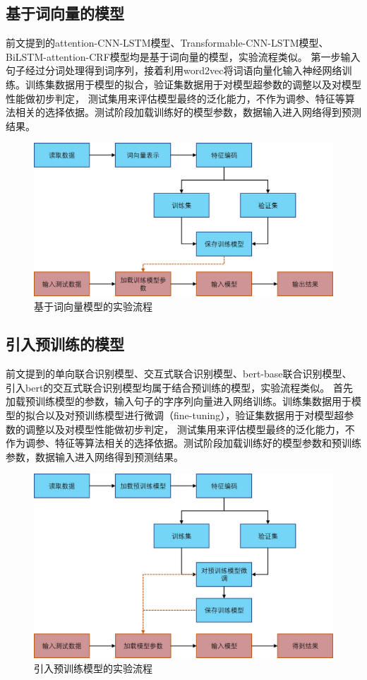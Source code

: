 \subsection{基于词向量的模型}
前文提到的attention-CNN-LSTM模型、Transformable-CNN-LSTM模型、BiLSTM-attention-CRF模型均是基于词向量的模型，实验流程类似。
第一步输入句子经过分词处理得到词序列，接着利用word2vec将词语向量化输入神经网络训练。训练集数据用于模型的拟合，验证集数据用于对模型超参数的调整以及对模型性能做初步判定，
测试集用来评估模型最终的泛化能力，不作为调参、特征等算法相关的选择依据。测试阶段加载训练好的模型参数，数据输入进入网络得到预测结果。
\begin{figure}[htbp]
  \centering
  \includegraphics[scale=0.5]{./images/word2vecTrain.jpg}
  \caption{基于词向量模型的实验流程}
  \label{fig:word2vecTrain}
\end{figure}

\subsection{引入预训练的模型}
前文提到的单向联合识别模型、交互式联合识别模型、bert-base联合识别模型、引入bert的交互式联合识别模型均属于结合预训练的模型，实验流程类似。
首先加载预训练模型的参数，输入句子的字序列向量进入网络训练。训练集数据用于模型的拟合以及对预训练模型进行微调（fine-tuning），验证集数据用于对模型超参数的调整以及对模型性能做初步判定，
测试集用来评估模型最终的泛化能力，不作为调参、特征等算法相关的选择依据。测试阶段加载训练好的模型参数和预训练参数，数据输入进入网络得到预测结果。
\begin{figure}[htbp]
  \centering
  \includegraphics[scale=0.5]{./images/bertTrain.jpg}
  \caption{引入预训练模型的实验流程}
  \label{fig:bertTrain}
\end{figure}


